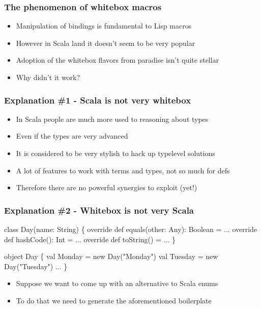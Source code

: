 \documentclass[svgnames,hyperref={bookmarks=false}]{beamer}
\begin{document}
\begin{frame}[fragile]
\frametitle{The phenomenon of whitebox macros}

\begin{itemize}
\item Manipulation of bindings is fundamental to Lisp macros
\item However in Scala land it doesn't seem to be very popular
\item Adoption of the whitebox flavors from paradise isn't quite stellar
\item Why didn't it work?
\end{itemize}
\end{frame}



\begin{frame}[fragile]
\frametitle{Explanation \#1 - Scala is not very whitebox}

\begin{itemize}
\item In Scala people are much more used to reasoning about types
\item Even if the types are very advanced
\item It is considered to be very stylish to hack up typelevel solutions
\item A lot of features to work with terms and types, not so much for defs
\item Therefore there are no powerful synergies to exploit (yet!)
\end{itemize}
\end{frame}

\begin{frame}[fragile]
\frametitle{Explanation \#2 - Whitebox is not very Scala}

\begin{semiverbatim}
class Day(name: String) \{
  override def equals(other: Any): Boolean = ...
  override def hashCode(): Int = ...
  override def toString() = ...
\}

object Day \{
  val Monday = new Day("Monday")
  val Tuesday = new Day("Tuesday")
  ...
\}

\end{semiverbatim}

\begin{itemize}
\item Suppose we want to come up with an alternative to Scala enums
\item To do that we need to generate the aforementioned boilerplate
\end{itemize}
\end{frame}
\end{document}
